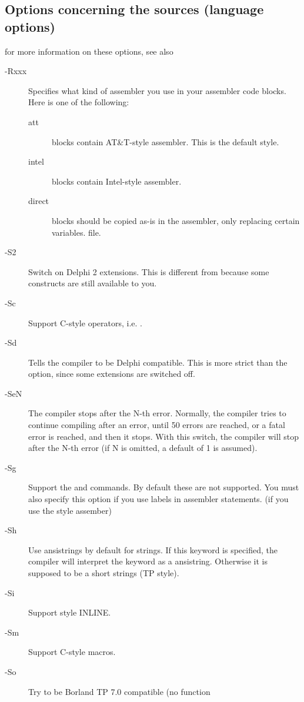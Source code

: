 \documentclass{book}
\begin{document}
\subsection{Options concerning the sources (language options)}
for more information on these options, see also \progref
\begin{description}
\item [-Rxxx]  Specifies what kind of assembler you use in
your  assembler code blocks. Here  is one of the following:
\begin{description}
\item [att\ ]  blocks contain AT\&T-style  assembler.
This is the default style.
\item [intel]  blocks contain Intel-style assembler.
\item [direct]  blocks should be copied as-is in the assembler,
only replacing certain variables.
file.
\end{description}
\item [-S2]  Switch on Delphi 2 extensions.  This is different
from  because some \fpc constructs are still available to you.
\item [-Sc]  Support C-style operators, i.e. .
\item [-Sd] Tells the compiler to be Delphi compatible. This is more strict
than the  option, since some  extensions are switched off.
\item [-SeN]  The compiler stops after the N-th error. Normally,
the compiler tries to continue compiling after an error, until 50 errors are
reached, or a fatal error is reached, and then it stops. With this switch,
the compiler will stop after the N-th error (if N is omitted, a default of 1
is assumed).
\item [-Sg]  Support the  and  commands. By
default these are not supported. You must also specify this option if you
use labels in assembler statements. (if you use the  style
assember)
\item [-Sh] Use ansistrings by default for strings. If this keyword is
specified, the compiler will interpret the  keyword as a
ansistring. Otherwise it is supposed to be a short strings (TP style).
\item [-Si]  Support  style INLINE.
\item [-Sm]  Support C-style macros.
\item [-So]  Try to be Borland TP 7.0 compatible (no function

\end{description}
\end{document}
